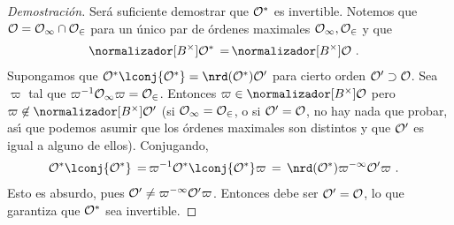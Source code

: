 \begin{proof}[Demostraci\'{o}n]
	Ser\'{a} suficiente demostrar que $\cal{O}^{*}$ es invertible.
	Notemos que $\cal{O}=\cal{O}_{1}\cap\cal{O}_{2}$ para un \'{u}nico
	par de \'{o}rdenes maximales $\cal{O}_{1},\cal{O}_{2}$ y que
	\begin{align*}
		\normalizador[B^{\times}]{\cal{O}^{*}} \,=\, &
		\normalizador[B^{\times}]{\cal{O}}
		\text{ .}
	\end{align*}
	Supongamos que $\cal{O}^{*}\lconj{\cal{O}^{*}}=%
	\nrd(\cal{O}^{*})\cal{O}'$ para cierto orden $\cal{O}'\supset\cal{O}$.
	Sea $\varpi$ tal que $\varpi^{-1}\cal{O}_{1}\varpi=\cal{O}_{2}$.
	Entonces $\varpi\in\normalizador[B^{\times}]{\cal{O}}$ pero
	$\varpi\not\in\normalizador[B^{\times}]{\cal{O}'}$
	(si $\cal{O}_{1}=\cal{O}_{2}$, o si $\cal{O}'=\cal{O}$, no hay nada
	que probar, as\'{\i} que podemos asumir que los \'{o}rdenes maximales
	son distintos y que $\cal{O}'$ es igual a alguno de ellos).
	Conjugando,
	\begin{align*}
		\cal{O}^{*}\lconj{\cal{O}^{*}} \,=\, &
		\varpi^{-1}\cal{O}^{*}\lconj{\cal{O}^{*}}\varpi
		\,=\, \nrd(\cal{O}^{*})\varpi^{-1}\cal{O}'\varpi
		\text{ .}
	\end{align*}
	Esto es absurdo, pues $\cal{O}'\not =\varpi^{-1}\cal{O}'\varpi$.
	Entonces debe ser $\cal{O}'=\cal{O}$, lo que garantiza que
	$\cal{O}^{*}$ sea invertible.
\end{proof}
% 
%

